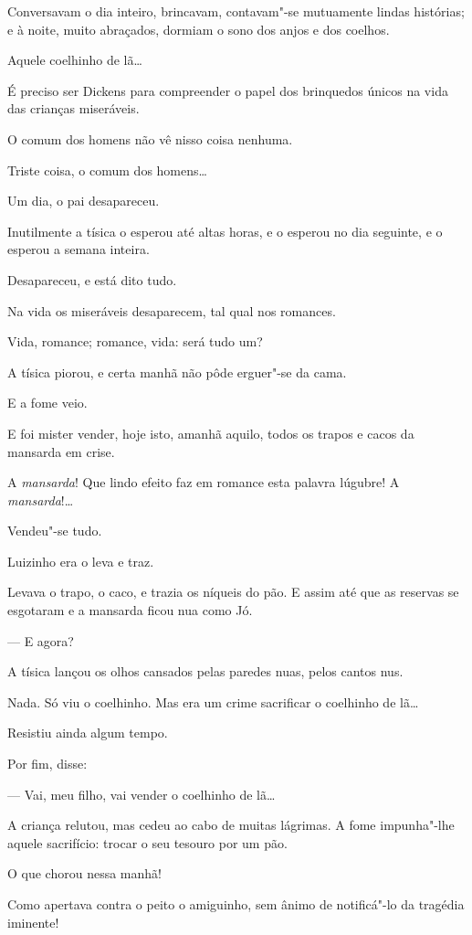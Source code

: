 Conversavam o dia inteiro, brincavam, contavam"-se mutuamente lindas
histórias; e à noite, muito abraçados, dormiam o sono dos anjos e dos
coelhos.

Aquele coelhinho de lã\ldots{}

É preciso ser Dickens para compreender o papel dos brinquedos únicos na
vida das crianças miseráveis.

O comum dos homens não vê nisso coisa nenhuma.

Triste coisa, o comum dos homens\ldots{}

Um dia, o pai desapareceu.

Inutilmente a tísica o esperou até altas horas, e o esperou no dia
seguinte, e o esperou a semana inteira.

Desapareceu, e está dito tudo.

Na vida os miseráveis desaparecem, tal qual nos romances.

Vida, romance; romance, vida: será tudo um?

A tísica piorou, e certa manhã não pôde erguer"-se da cama.

E a fome veio.

E foi mister vender, hoje isto, amanhã aquilo, todos os trapos e cacos
da mansarda em crise.

A \emph{mansarda}! Que lindo efeito faz em romance esta palavra lúgubre!
A \emph{mansarda}!\ldots{}

Vendeu"-se tudo.

Luizinho era o leva e traz.

Levava o trapo, o caco, e trazia os níqueis do pão. E assim até que as
reservas se esgotaram e a mansarda ficou nua como Jó.

--- E agora?

A tísica lançou os olhos cansados pelas paredes nuas, pelos cantos nus.

Nada. Só viu o coelhinho. Mas era um crime sacrificar o coelhinho de
lã\ldots{}

Resistiu ainda algum tempo.

Por fim, disse:

--- Vai, meu filho, vai vender o coelhinho de lã\ldots{}

A criança relutou, mas cedeu ao cabo de muitas lágrimas. A fome
impunha"-lhe aquele sacrifício: trocar o seu tesouro por um pão.

O que chorou nessa manhã!

Como apertava contra o peito o amiguinho, sem ânimo de notificá"-lo da
tragédia iminente!

